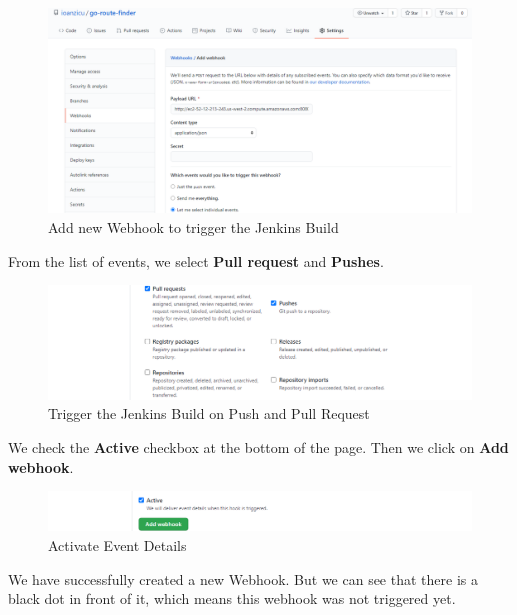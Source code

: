 \documentclass[12pt,a4paper,twoside]{article}
\begin{document}
\begin{figure}[H]
    \centering
        \includegraphics[width=15cm]{images-aws/42-web-hook-setup.png}
        \caption{Add new Webhook to trigger the Jenkins Build}
\end{figure}


From the list of events, we select \textbf{Pull request} and \textbf{Pushes}.


\begin{figure}[H]
    \centering
        \includegraphics[width=13cm]{images-aws/43-web-hook-setup-pull.png}
        \caption{Trigger the Jenkins Build on Push and Pull Request}
\end{figure}

 We check the \textbf{Active} checkbox at the bottom of the page. Then we click on \textbf{Add webhook}.

\begin{figure}[H]
    \centering
        \includegraphics[width=13cm]{images-aws/44-web-hook-setup-activate.png}
        \caption{Activate Event Details}
\end{figure}


We have successfully created a new Webhook. But we can see that there is a black dot in  front of it, which means this webhook was not triggered yet.
\end{document}
